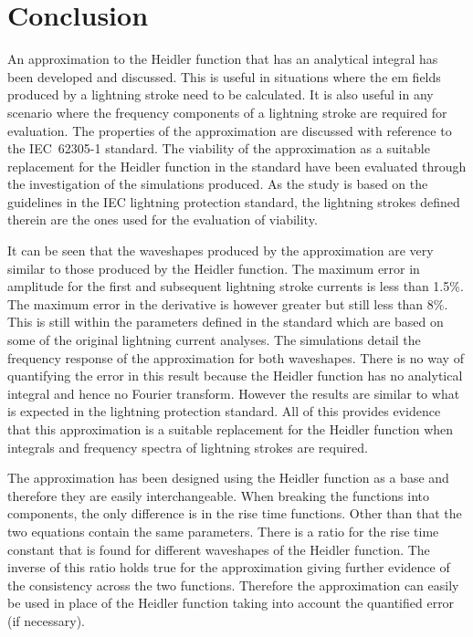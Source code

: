 
\chapter{Conclusion} %

\label{ChapterConclusion} %


An approximation to the Heidler function that has an analytical integral has been developed and discussed. This is useful in situations where the \gls{em} fields produced by a lightning stroke need to be calculated. It is also useful in any scenario where the frequency components of a lightning stroke are required for evaluation. The properties of the approximation are discussed with reference to the IEC~62305-1 standard. The viability of the approximation as a suitable replacement for the Heidler function in the standard have been evaluated through the investigation of the simulations produced. As the study is based on the guidelines in the IEC lightning protection standard, the lightning strokes defined therein are the ones used for the evaluation of viability.

It can be seen that the waveshapes produced by the approximation are very similar to those produced by the Heidler function. The maximum error in amplitude for the first and subsequent lightning stroke currents is less than 1.5\%. The maximum error in the derivative is however greater but still less than 8\%. This is still within the parameters defined in the standard which are based on some of the original lightning current analyses. The simulations detail the frequency response of the approximation for both waveshapes. There is no way of quantifying the error in this result because the Heidler function has no analytical integral and hence no Fourier transform. However the results are similar to what is expected in the lightning protection standard. All of this provides evidence that this approximation is a suitable replacement for the Heidler function when integrals and frequency spectra of lightning strokes are required.

The approximation has been designed using the Heidler function as a base and therefore they are easily interchangeable. When breaking the functions into components, the only difference is in the rise time functions. Other than that the two equations contain the same parameters. There is a ratio for the rise time constant that is found for different waveshapes of the Heidler function. The inverse of this ratio holds true for the approximation giving further evidence of the consistency across the two functions. Therefore the approximation can easily be used in place of the Heidler function taking into account the quantified error (if necessary).

